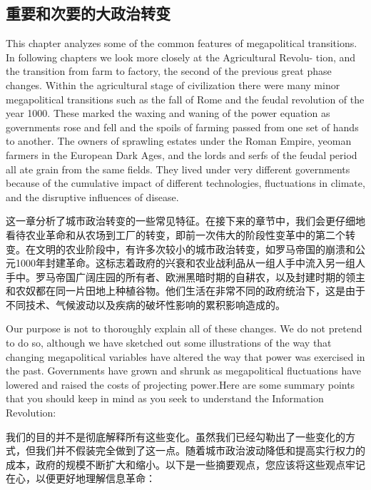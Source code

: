 \begin{Parallel}{97mm}{45mm}
  \subsection{重要和次要的大政治转变}


  \ParallelLText
  {This chapter analyzes some of the common features of megapolitical transitions. In following chapters we look more closely at the Agricultural Revolu- tion, and the transition from farm to factory, the second of the previous great phase changes. Within the agricultural stage of civilization there were many minor megapolitical transitions such as the fall of Rome and the feudal revolution of the year 1000. These marked the waxing and waning of the power equation as governments rose and fell and the spoils of farming passed from one set of hands to another. The owners of sprawling estates under the Roman Empire, yeoman farmers in the European Dark Ages, and the lords and serfs of the feudal period all ate grain from the same fields. They lived under very different governments because of the cumulative impact of different technologies, fluctuations in climate, and the disruptive influences of disease.}
  
  \ParallelRText
  {这一章分析了城市政治转变的一些常见特征。在接下来的章节中，我们会更仔细地看待农业革命和从农场到工厂的转变，即前一次伟大的阶段性变革中的第二个转变。在文明的农业阶段中，有许多次较小的城市政治转变，如罗马帝国的崩溃和公元1000年封建革命。这标志着政府的兴衰和农业战利品从一组人手中流入另一组人手中。罗马帝国广阔庄园的所有者、欧洲黑暗时期的自耕农，以及封建时期的领主和农奴都在同一片田地上种植谷物。他们生活在非常不同的政府统治下，这是由于不同技术、气候波动以及疾病的破坏性影响的累积影响造成的。}
  \ParallelPar



  \ParallelLText
  {Our purpose is not to thoroughly explain all of these changes. We do not pretend to do so, although we have sketched out some illustrations of the way that changing megapolitical variables have altered the way that power was exercised in the past. Governments have grown and shrunk as megapolitical fluctuations have lowered and raised the costs of projecting power.Here are some summary points that you should keep in mind as you seek to understand the Information Revolution:}
  
  \ParallelRText
  {我们的目的并不是彻底解释所有这些变化。虽然我们已经勾勒出了一些变化的方式，但我们并不假装完全做到了这一点。随着城市政治波动降低和提高实行权力的成本，政府的规模不断扩大和缩小。以下是一些摘要观点，您应该将这些观点牢记在心，以便更好地理解信息革命：}
  \ParallelPar




\end{Parallel}
